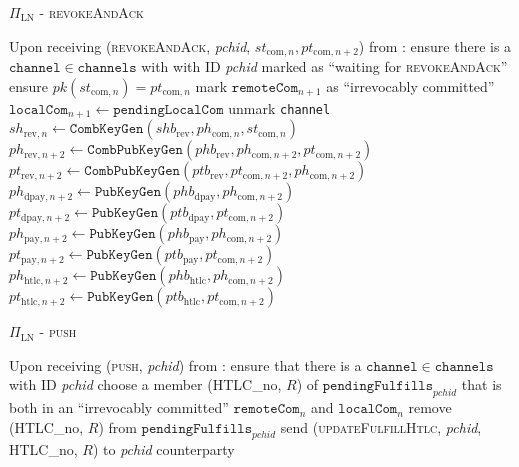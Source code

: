 \begin{protocolbox}{$\Pi_{\mathrm{LN}}$ - \textsc{revokeAndAck}}
  \label{alg:protocol:pay:revokeAndAck}
  \begin{algorithmic}[1]
    \State Upon receiving (\textsc{revokeAndAck}, \textit{pchid},
    $st_{\mathrm{com}, n}, pt_{\mathrm{com}, n+2}$) from \bob:
    \Indent
      \State ensure there is a $\mathtt{channel} \in \mathtt{channels}$ with
      \bob{} with ID \textit{pchid} marked as ``waiting for
      \textsc{revokeAndAck}''
      \State ensure $pk\left(st_{\mathrm{com}, n}\right) = pt_{\mathrm{com}, n}$
      \State mark $\mathtt{remoteCom}_{n+1}$ as ``irrevocably committed''
      \State $\mathtt{localCom}_{n+1} \gets \mathtt{pendingLocalCom}$
      \State unmark \texttt{channel}
      \State $sh_{\mathrm{rev}, n} \gets
      \mathtt{CombKeyGen}\left(shb_{\mathrm{rev}}, ph_{\mathrm{com}, n},
      st_{\mathrm{com}, n}\right)$
      \State $ph_{\mathrm{rev}, n+2} \gets
      \mathtt{CombPubKeyGen}\left(phb_{\mathrm{rev}}, ph_{\mathrm{com}, n+2},
      pt_{\mathrm{com}, n+2}\right)$
      \State $pt_{\mathrm{rev}, n+2} \gets
      \mathtt{CombPubKeyGen}\left(ptb_{\mathrm{rev}}, pt_{\mathrm{com}, n+2},
      ph_{\mathrm{com}, n+2}\right)$
      \State $ph_{\mathrm{dpay}, n+2} \gets
      \texttt{PubKeyGen}\left(phb_{\mathrm{dpay}}, ph_{\mathrm{com},
      n+2}\right)$
      \State $pt_{\mathrm{dpay}, n+2} \gets
      \texttt{PubKeyGen}\left(ptb_{\mathrm{dpay}}, pt_{\mathrm{com},
      n+2}\right)$
      \State $ph_{\mathrm{pay}, n+2} \gets
      \texttt{PubKeyGen}\left(phb_{\mathrm{pay}}, ph_{\mathrm{com}, n+2}\right)$
      \State $pt_{\mathrm{pay}, n+2} \gets
      \texttt{PubKeyGen}\left(ptb_{\mathrm{pay}}, pt_{\mathrm{com}, n+2}\right)$
      \State $ph_{\mathrm{htlc}, n+2} \gets
      \texttt{PubKeyGen}\left(phb_{\mathrm{htlc}}, ph_{\mathrm{com},
      n+2}\right)$
      \State $pt_{\mathrm{htlc}, n+2} \gets
      \texttt{PubKeyGen}\left(ptb_{\mathrm{htlc}}, pt_{\mathrm{com},
      n+2}\right)$
    \EndIndent
  \end{algorithmic}
\end{protocolbox}

\begin{protocolbox}{$\Pi_{\mathrm{LN}}$ - \textsc{push}}
\label{alg:protocol:pay:push}
  \begin{algorithmic}[1]
    \State Upon receiving (\textsc{push}, \textit{pchid}) from \environment:
    \Indent
      \State ensure that there is a $\mathtt{channel} \in \mathtt{channels}$
      with ID \textit{pchid}
      \State choose a member (HTLC\_no, $R$) of
      $\mathtt{pendingFulfills}_{\mathit{pchid}}$ that is both in an
      ``irrevocably committed'' $\mathtt{remoteCom}_n$ and $\mathtt{localCom}_n$
      \State remove (HTLC\_no, $R$) from
      $\mathtt{pendingFulfills}_{\mathit{pchid}}$
      \State send (\textsc{updateFulfillHtlc}, \textit{pchid}, HTLC\_no, $R$) to
      \textit{pchid} counterparty
    \EndIndent
  \end{algorithmic}
\end{protocolbox}

